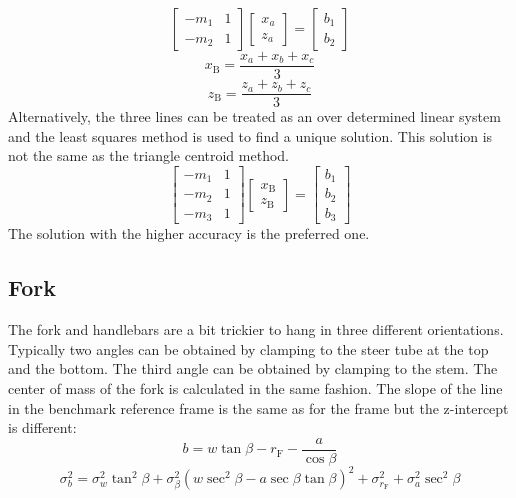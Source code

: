 \documentclass{bmd2010p}
\begin{document}
\begin{equation}
	\left[
	\begin{array}{cc}
		-m_1 & 1\\
		-m_2 & 1
	\end{array}
	\right]
	\left[
	\begin{array}{c}
		x_a\\
		z_a
	\end{array}
	\right]
	=
	\left[
	\begin{array}{c}
		b_1\\
		b_2
	\end{array}
	\right]
\label{eq:linearSystem}
\end{equation}
\begin{equation}
    x_\mathrm{B} = \frac{x_a + x_b + x_c}{3}
\end{equation}
\begin{equation}
    z_\mathrm{B} = \frac{z_a + z_b + z_c}{3}
\end{equation}
Alternatively, the three lines can be treated as an over determined linear
system and the least squares method is used to find a unique solution. This
solution is not the same as the triangle centroid method.
\begin{equation}
	\left[
	\begin{array}{cc}
		-m_1 & 1\\
		-m_2 & 1\\
		-m_3 & 1
	\end{array}
	\right]
	\left[
	\begin{array}{c}
        x_\mathrm{B}\\
        z_\mathrm{B}
	\end{array}
	\right]
	=
	\left[
	\begin{array}{c}
		b_1\\
		b_2\\
		b_3
	\end{array}
	\right]	
\label{eq:leastSquares}
\end{equation}
The solution with the higher accuracy is the preferred one.
\subsection{Fork}
The fork and handlebars are a bit trickier to hang in three different
orientations. Typically two angles can be obtained by clamping to the steer
tube at the top and the bottom. The third angle can be obtained by clamping to
the stem. The center of mass of the fork is calculated in the same fashion. The
slope of the line in the benchmark reference frame is the same as for the
frame but the z-intercept is different:
\begin{equation}
    b = w\tan{\beta} - r_\mathrm{F} - \frac{a}{\cos{\beta}} 
    \label{eq:zIntFork}
\end{equation}
\begin{equation}
    \sigma_{b}^{2} = \sigma_{w}^{2}\tan^{2}\beta +
    \sigma_{\beta}^{2}\left(w\sec^{2}\beta -
    a\sec\beta\tan\beta\right)^{2} + \sigma_{r_\mathrm{F}}^{2} +
    \sigma_{a}^{2}\sec^{2}\beta
    \label{eq:zIntForkVar}
\end{equation}
\end{document}
